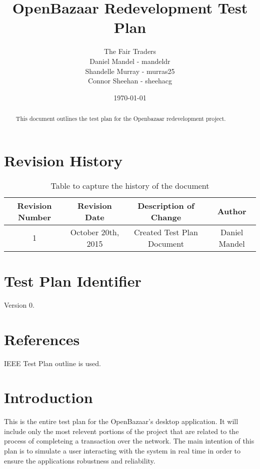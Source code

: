 \documentclass{article}
\begin{document}
\title{OpenBazaar Redevelopment Test Plan}
\author{The Fair Traders \\ Daniel Mandel - mandeldr \\ Shandelle Murray - murras25 \\ Connor Sheehan - sheehacg}
\date{\today}
\maketitle

\begin{abstract}
This document outlines the test plan for the Openbazaar redevelopment project.
\end{abstract}

\clearpage

\tableofcontents

\section*{Revision History}

\begin{table}[h!]
\centering
\begin{tabular}{||c c c c||} 
 \hline
 Revision Number & Revision Date & Description of Change & Author \\ [0.5ex] 
 \hline\hline
 1 & October 20th, 2015 & Created Test Plan Document & Daniel Mandel \\ [1ex] 
 \hline
\end{tabular}
\caption{Table to capture the history of the document}
\label{table:1}
\end{table}


\section*{Test Plan Identifier}
Version 0.

\section*{References}
IEEE Test Plan outline is used.

\section*{Introduction}
This is the entire test plan for the OpenBazaar's desktop application.
It will include only the most relevent portions of the project that are related to
the process of completeing a transaction over the network.
The main intention of this plan is to simulate a user interacting with the system in real time in order to ensure the applications robustness and reliability.
\end{document}
